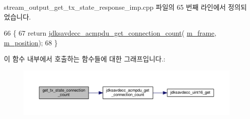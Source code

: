 stream\+\_\+output\+\_\+get\+\_\+tx\+\_\+state\+\_\+response\+\_\+imp.\+cpp 파일의 65 번째 라인에서 정의되었습니다.


\begin{DoxyCode}
66 \{
67     \textcolor{keywordflow}{return} \hyperlink{group__acmpdu_ga28f4116aa95376ec5378febf22e830b5}{jdksavdecc\_acmpdu\_get\_connection\_count}(
      \hyperlink{classavdecc__lib_1_1stream__output__get__tx__state__response__imp_a50417969cf438e7c8d698726bbbe2ff9}{m\_frame}, \hyperlink{classavdecc__lib_1_1stream__output__get__tx__state__response__imp_af5e691c4a8a0feb07f48440b321206cd}{m\_position});
68 \}
\end{DoxyCode}


이 함수 내부에서 호출하는 함수들에 대한 그래프입니다.\+:
\nopagebreak
\begin{figure}[H]
\begin{center}
\leavevmode
\includegraphics[width=350pt]{classavdecc__lib_1_1stream__output__get__tx__state__response__imp_a9654ce9f3bf2bafcdacd288a372ac7eb_cgraph}
\end{center}
\end{figure}


